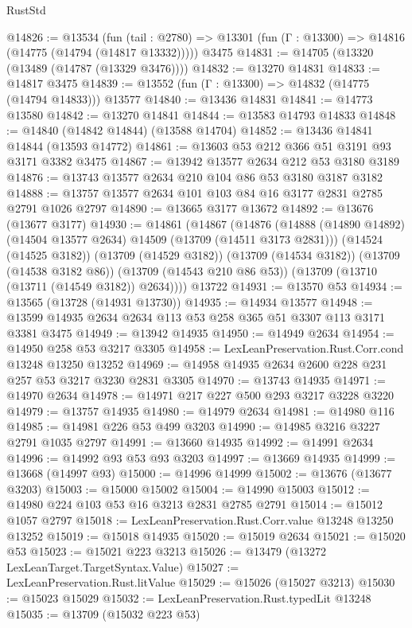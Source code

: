 \begin{lexlean}{RustStd}
\begin{coremodule}
@14826 := @13534
    (fun (tail : @2780) => @13301 (fun (Γ : @13300) => @14816 (@14775 (@14794 (@14817 @13332)))))
    @3475
@14831 := @14705 (@13320 (@13489 (@14787 (@13329 @3476))))
@14832 := @13270 @14831
@14833 := @14817 @3475
@14839 := @13552 (fun (Γ : @13300) => @14832 (@14775 (@14794 @14833))) @13577
@14840 := @13436 @14831
@14841 := @14773 @13580
@14842 := @13270 @14841
@14844 := @13583 @14793 @14833
@14848 := @14840 (@14842 @14844) (@13588 @14704)
@14852 := @13436 @14841 @14844 (@13593 @14772)
@14861 := @13603 @53 @212 @366 @51 @3191 @93 @3171 @3382 @3475
@14867 := @13942 @13577 @2634 @212 @53 @3180 @3189
@14876 := @13743 @13577 @2634 @210 @104 @86 @53 @3180 @3187 @3182
@14888 := @13757 @13577 @2634 @101 @103 @84 @16 @3177 @2831 @2785 @2791 @1026 @2797
@14890 := @13665 @3177 @13672
@14892 := @13676 (@13677 @3177)
@14930 := @14861
    (@14867
      (@14876
        (@14888 (@14890 @14892) (@14504 @13577 @2634) @14509 (@13709 (@14511 @3173 @2831)))
        (@14524 (@14525 @3182))
        (@13709 (@14529 @3182))
        (@13709 (@14534 @3182))
        (@13709 (@14538 @3182 @86))
        (@13709 (@14543 @210 @86 @53))
        (@13709 (@13710 (@13711 (@14549 @3182)) @2634))))
    @13722
@14931 := @13570 @53
@14934 := @13565 (@13728 (@14931 @13730))
@14935 := @14934 @13577
@14948 := @13599 @14935 @2634 @2634 @113 @53 @258 @365 @51 @3307 @113 @3171 @3381 @3475
@14949 := @13942 @14935
@14950 := @14949 @2634
@14954 := @14950 @258 @53 @3217 @3305
@14958 := LexLeanPreservation.Rust.Corr.cond @13248 @13250 @13252
@14969 := @14958 @14935 @2634 @2600 @228 @231 @257 @53 @3217 @3230 @2831 @3305
@14970 := @13743 @14935
@14971 := @14970 @2634
@14978 := @14971 @217 @227 @500 @293 @3217 @3228 @3220
@14979 := @13757 @14935
@14980 := @14979 @2634
@14981 := @14980 @116
@14985 := @14981 @226 @53 @499 @3203
@14990 := @14985 @3216 @3227 @2791 @1035 @2797
@14991 := @13660 @14935
@14992 := @14991 @2634
@14996 := @14992 @93 @53 @93 @3203
@14997 := @13669 @14935
@14999 := @13668 (@14997 @93)
@15000 := @14996 @14999
@15002 := @13676 (@13677 @3203)
@15003 := @15000 @15002
@15004 := @14990 @15003
@15012 := @14980 @224 @103 @53 @16 @3213 @2831 @2785 @2791
@15014 := @15012 @1057 @2797
@15018 := LexLeanPreservation.Rust.Corr.value @13248 @13250 @13252
@15019 := @15018 @14935
@15020 := @15019 @2634
@15021 := @15020 @53
@15023 := @15021 @223 @3213
@15026 := @13479 (@13272 LexLeanTarget.TargetSyntax.Value)
@15027 := LexLeanPreservation.Rust.litValue
@15029 := @15026 (@15027 @3213)
@15030 := @15023 @15029
@15032 := LexLeanPreservation.Rust.typedLit @13248
@15035 := @13709 (@15032 @223 @53)

\end{coremodule}
\end{lexlean}
